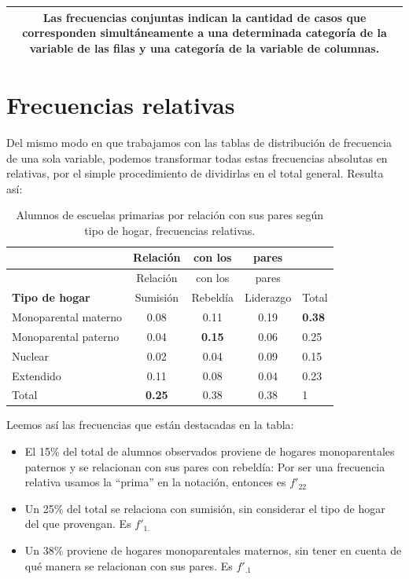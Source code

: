 \documentclass[]{book}
\begin{document}
\begin{longtable}[]{@{}c@{}}
\toprule
\endhead
\begin{minipage}[t]{0.97\columnwidth}\centering
Las \textbf{frecuencias conjuntas} indican la cantidad de casos que corresponden simultáneamente a una determinada categoría de la variable de las filas y una categoría de la variable de columnas.\strut
\end{minipage}\tabularnewline
\bottomrule
\end{longtable}

\hypertarget{frecuencias-relativas}{%
\section{Frecuencias relativas}\label{frecuencias-relativas}}

Del mismo modo en que trabajamos con las tablas de distribución de
frecuencia de una sola variable, podemos transformar todas estas
frecuencias absolutas en relativas, por el simple procedimiento de
dividirlas en el total general. Resulta así:

\begin{longtable}[]{@{}lcccl@{}}
\caption{\label{tab:unnamed-chunk-124}Alumnos de escuelas primarias por relación con sus pares según tipo de hogar, frecuencias relativas.}\tabularnewline
\toprule
& Relación & con los & pares &\tabularnewline
\midrule
\endfirsthead
\toprule
& Relación & con los & pares &\tabularnewline
\midrule
\endhead
\textbf{Tipo de hogar} & Sumisión & Rebeldía & Liderazgo & Total\tabularnewline
Monoparental materno & 0.08 & 0.11 & 0.19 & \textbf{0.38}\tabularnewline
Monoparental paterno & 0.04 & \textbf{0.15} & 0.06 & 0.25\tabularnewline
Nuclear & 0.02 & 0.04 & 0.09 & 0.15\tabularnewline
Extendido & 0.11 & 0.08 & 0.04 & 0.23\tabularnewline
Total & \textbf{0.25} & 0.38 & 0.38 & 1\tabularnewline
\bottomrule
\end{longtable}

Leemos así las frecuencias que están destacadas en la tabla:

\begin{itemize}
\item
  El 15\% del total de alumnos observados proviene de hogares
  monoparentales paternos y se relacionan con sus pares con rebeldía: Por ser una frecuencia relativa usamos la ``prima'' en la notación, entonces es \(f'_{22}\)
\item
  Un 25\% del total se relaciona con sumisión, sin considerar el tipo de hogar del que provengan. Es \(f'_{1.}\)
\item
  Un 38\% proviene de hogares monoparentales maternos, sin tener en cuenta de qué manera se relacionan con sus pares. Es \(f'_{.1}\)
\end{itemize}
\end{document}

